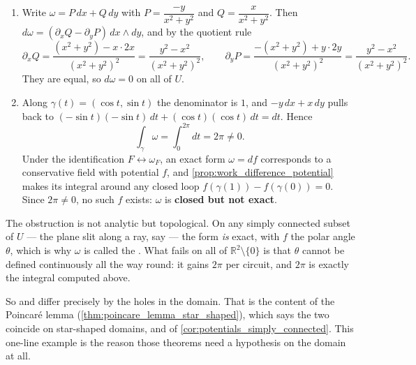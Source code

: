 \begin{exercisesolution}
\label{sol:ai_angle_form_closed}
\begin{enumerate}[label=\textbf{(\alph*)}]
  \item Write $\omega = P\,dx + Q\,dy$ with $P = \dfrac{-y}{x^2+y^2}$ and
    $Q = \dfrac{x}{x^2+y^2}$. Then $d\omega = (\partial_xQ - \partial_yP)\,dx\wedge dy$, and by
    the quotient rule
    \[\partial_xQ = \frac{(x^2+y^2) - x\cdot 2x}{(x^2+y^2)^2} = \frac{y^2-x^2}{(x^2+y^2)^2},
      \qquad
      \partial_yP = \frac{-(x^2+y^2) + y\cdot 2y}{(x^2+y^2)^2} = \frac{y^2-x^2}{(x^2+y^2)^2}.\]
    They are equal, so $d\omega = 0$ on all of $U$.
  \item Along $\gamma(t) = (\cos t,\sin t)$ the denominator is $1$, and
    $-y\,dx + x\,dy$ pulls back to $(-\sin t)(-\sin t)\,dt + (\cos t)(\cos t)\,dt = dt$. Hence
    \[\int_\gamma \omega = \int_0^{2\pi} dt = 2\pi \neq 0.\]
    Under the identification $F \leftrightarrow \omega_F$, an exact form $\omega = df$
    corresponds to a conservative field with potential $f$, and
    \cref{prop:work_difference_potential} makes its integral around any closed loop
    $f(\gamma(1)) - f(\gamma(0)) = 0$. Since $2\pi \neq 0$, no such $f$ exists: $\omega$ is
    \textbf{closed but not exact}.
\end{enumerate}

\begin{remark}
\label{rem:angle_form_hole}
The obstruction is not analytic but topological. On any simply connected subset of $U$ --- the
plane slit along a ray, say --- the form \emph{is} exact, with $f$ the polar angle $\theta$,
which is why $\omega$ is called the . What fails on all of
$\mathbb{R}^2\setminus\{0\}$ is that $\theta$ cannot be defined continuously all the way round:
it gains $2\pi$ per circuit, and $2\pi$ is exactly the integral computed above.

So  and  differ precisely by the holes in the domain. That is the content of
the Poincaré lemma (\cref{thm:poincare_lemma_star_shaped}), which says the two coincide on star-shaped
domains, and of \cref{cor:potentials_simply_connected}. This one-line example is the reason those
theorems need a hypothesis on the domain at all.
\end{remark}
\end{exercisesolution}

